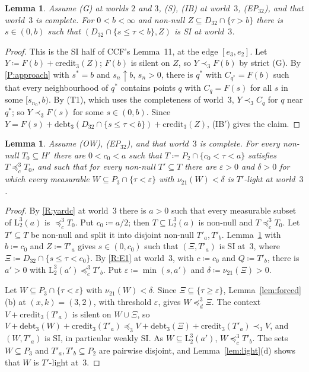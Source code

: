 \documentclass[11pt]{article}
\newtheorem{lemma}[theorem]{Lemma}
\theoremstyle{definition}\newtheorem{definition}[theorem]{Definition}
\theoremstyle{remark}\newtheorem{remark}[theorem]{Remark}
\newcommand{\debt}{\mathrm{debt}}
\newcommand{\cred}{\mathrm{credit}}
\newcommand{\Lo}[3]{\mathrm L^{#1}_{#2}(#3)}
\begin{document}
\begin{lemma}\label{lem:SI3}
Assume (G) at worlds $2$ and $3$, (S), (IB) at world~$3$, (EP$_{32}$), and
that world~$3$ is complete. For $0<b<\infty$ and non-null $Z\subseteq
D_{32}\cap\{\tau>b\}$ there is $s\in(0,b)$ such that
$(D_{32}\cap\{s\le\tau<b\},Z)$ is SI at world~$3$.
\end{lemma}
\begin{proof}
This is the SI half of CCF's Lemma~11, at the edge $[e_3,e_2]$. Let
$Y\coloneqq F(b)+\cred_3(Z)$; $F(b)$ is silent on $Z$, so $Y\prec_3F(b)$ by
strict (G). By \ref{P:approach} with $s^*=b$ and $s_n\uparrow b$, $s_n>0$,
there is $q^*$ with $C_{q^*}=F(b)$ such that every neighbourhood of $q^*$
contains points $q$ with $C_q=F(s)$ for all $s$ in some $[s_{n_0},b)$. By
(T1), which uses the completeness of world~$3$, $Y\prec_3C_q$ for $q$ near
$q^*$; so $Y\prec_3F(s)$ for some $s\in(0,b)$. Since
$Y=F(s)+\debt_3(D_{32}\cap\{s\le\tau<b\})+\cred_3(Z)$, (IB$'$) gives the
claim.
\end{proof}

\begin{lemma}\label{lem:fulllight}
Assume (OW), (EP$_{32}$), and that world~$3$ is complete. For every non-null
$T_0\subseteq H'$ there are $0<c_0<a$ such that
$T\coloneqq P_2\cap\{c_0<\tau<a\}$ satisfies $T\preceq^3_cT_0$, and such
that for every non-null $T'\subseteq T$ there are $\varepsilon>0$ and $\delta>0$ for
which every measurable $W\subseteq P_3\cap\{\tau<\varepsilon\}$ with
$\nu_{21}(W)<\delta$ is $T'$-light at world~$3$.
\end{lemma}
\begin{proof}
By \ref{R:yardc} at world~$3$ there is $a>0$ such that every measurable
subset of $\Lo32a$ is $\preceq^3_cT_0$. Put $c_0\coloneqq a/2$; then
$T\subseteq\Lo32a$ is non-null and $T\preceq^3_cT_0$. Let $T'\subseteq T$
be non-null and split it into disjoint non-null $T'_a,T'_b$.
Lemma~\ref{lem:SI3} with $b\coloneqq c_0$ and $Z\coloneqq T'_a$ gives
$s\in(0,c_0)$ such that $(\Xi,T'_a)$ is SI at~$3$, where
$\Xi\coloneqq D_{32}\cap\{s\le\tau<c_0\}$. By \ref{R:E1} at world~$3$, with
$c\coloneqq c_0$ and $Q\coloneqq T'_b$, there is $a'>0$ with
$\Lo32{a'}\preceq^3_cT'_b$. Put $\varepsilon\coloneqq\min(s,a')$ and
$\delta\coloneqq\nu_{21}(\Xi)>0$.

Let $W\subseteq P_3\cap\{\tau<\varepsilon\}$ with $\nu_{21}(W)<\delta$. Since
$\Xi\subseteq\{\tau\ge \varepsilon\}$, Lemma~\ref{lem:forced}(b) at $(x,k)=(3,2)$, with
threshold $\varepsilon$, gives $W\preceq^3_d\Xi$. The context $V+\cred_3(T'_a)$ is
silent on $W\cup\Xi$, so
$V+\debt_3(W)+\cred_3(T'_a)\preceq_3V+\debt_3(\Xi)+\cred_3(T'_a)\prec_3V$,
and $(W,T'_a)$ is SI, in particular weakly SI. As $W\subseteq\Lo32{a'}$,
$W\preceq^3_cT'_b$. The sets $W\subseteq P_3$ and $T'_a,T'_b\subseteq P_2$
are pairwise disjoint, and Lemma~\ref{lem:light}(d) shows that $W$ is
$T'$-light at~$3$.
\end{proof}
\end{document}
